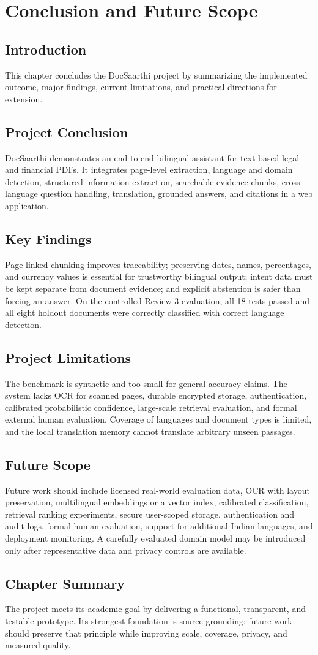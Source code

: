 \chapter{Conclusion and Future Scope}
\label{chap:conclusion}

\section{Introduction}
This chapter concludes the DocSaarthi project by summarizing the implemented outcome, major findings, current limitations, and practical directions for extension.

\section{Project Conclusion}
DocSaarthi demonstrates an end-to-end bilingual assistant for text-based legal and financial PDFs. It integrates page-level extraction, language and domain detection, structured information extraction, searchable evidence chunks, cross-language question handling, translation, grounded answers, and citations in a web application.

\section{Key Findings}
Page-linked chunking improves traceability; preserving dates, names, percentages, and currency values is essential for trustworthy bilingual output; intent data must be kept separate from document evidence; and explicit abstention is safer than forcing an answer. On the controlled Review 3 evaluation, all 18 tests passed and all eight holdout documents were correctly classified with correct language detection.

\section{Project Limitations}
The benchmark is synthetic and too small for general accuracy claims. The system lacks OCR for scanned pages, durable encrypted storage, authentication, calibrated probabilistic confidence, large-scale retrieval evaluation, and formal external human evaluation. Coverage of languages and document types is limited, and the local translation memory cannot translate arbitrary unseen passages.

\section{Future Scope}
Future work should include licensed real-world evaluation data, OCR with layout preservation, multilingual embeddings or a vector index, calibrated classification, retrieval ranking experiments, secure user-scoped storage, authentication and audit logs, formal human evaluation, support for additional Indian languages, and deployment monitoring. A carefully evaluated domain model may be introduced only after representative data and privacy controls are available.

\section*{Chapter Summary}
The project meets its academic goal by delivering a functional, transparent, and testable prototype. Its strongest foundation is source grounding; future work should preserve that principle while improving scale, coverage, privacy, and measured quality.
